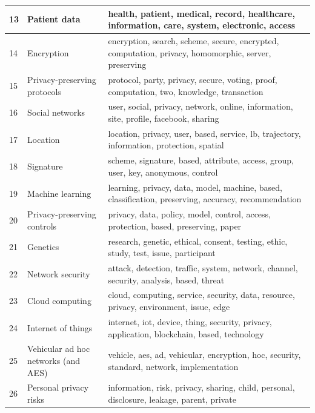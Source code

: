 \documentclass[runningheads]{llncs}
\begin{document}
\begin{longtable}{|p{0.03\linewidth}|p{0.27\linewidth}|p{0.7\linewidth}|}
13 & Patient data                        & health, patient, medical, record, healthcare, information, care, system, electronic, access            \\ \hline
14 & Encryption                          & encryption, search, scheme, secure, encrypted, computation, privacy, homomorphic, server, preserving   \\ \hline
15 & Privacy-preserving protocols        & protocol, party, privacy, secure, voting, proof, computation, two, knowledge, transaction              \\ \hline
16 & Social networks                     & user, social, privacy, network, online, information, site, profile, facebook, sharing                  \\ \hline
17 & Location                            & location, privacy, user, based, service, lb, trajectory, information, protection, spatial              \\ \hline
18 & Signature                           & scheme, signature, based, attribute, access, group, user, key, anonymous, control                      \\ \hline
19 & Machine learning                    & learning, privacy, data, model, machine, based, classification, preserving, accuracy, recommendation   \\ \hline
20 & Privacy-preserving controls         & privacy, data, policy, model, control, access, protection, based, preserving, paper                    \\ \hline
21 & Genetics                            & research, genetic, ethical, consent, testing, ethic, study, test, issue, participant                   \\ \hline
22 & Network security                    & attack, detection, traffic, system, network, channel, security, analysis, based, threat                \\ \hline
23 & Cloud computing                     & cloud, computing, service, security, data, resource, privacy, environment, issue, edge                 \\ \hline
24 & Internet of things                  & internet, iot, device, thing, security, privacy, application, blockchain, based, technology            \\ \hline
25 & Vehicular ad hoc networks (and AES) & vehicle, aes, ad, vehicular, encryption, hoc, security, standard, network, implementation              \\ \hline
26 & Personal privacy risks              & information, risk, privacy, sharing, child, personal, disclosure, leakage, parent, private             \\ \hline

\end{longtable}
\end{document}
